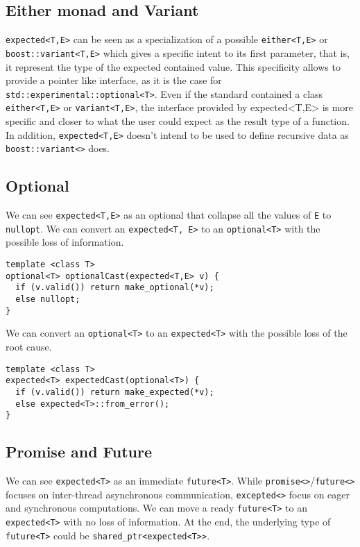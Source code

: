 \documentclass[a4paper,10pt]{article}
\newcommand{\cpp}[1]{\lstinline{#1}}
\begin{document}
\subsection{Either monad and Variant}

\cpp{expected<T,E>} can be seen as a specialization of a possible \cpp{either<T,E>} or \cpp{boost::variant<T,E>} which gives a specific intent to its first parameter, that is, it represent the type of the expected contained value. This specificity allows to provide a pointer like interface, as it is the case for \cpp{std::experimental::optional<T>}. Even if the standard contained a class \cpp{either<T,E>} or \cpp{variant<T,E>}, the interface provided by expected<T,E> is more specific and closer to what the user could expect as the result type of a function. In addition, \cpp{expected<T,E>} doesn't intend to be used to define recursive data as \cpp{boost::variant<>} does.

\subsection{Optional}

We can see \cpp{expected<T,E>} as an optional that collapse all the values of \cpp{E} to \cpp{nullopt}. We can convert an \cpp{expected<T, E>} to an \cpp{optional<T>} with the possible loss of information.

\begin{lstlisting}
template <class T>
optional<T> optionalCast(expected<T,E> v) {
  if (v.valid()) return make_optional(*v);
  else nullopt;
}
\end{lstlisting}

We can convert an \cpp{optional<T>} to an \cpp{expected<T>} with the possible loss of the root cause.

\begin{lstlisting}
template <class T>
expected<T> expectedCast(optional<T>) {
  if (v.valid()) return make_expected(*v);
  else expected<T>::from_error();
}
\end{lstlisting}

\subsection{Promise and Future}

We can see \cpp{expected<T>} as an immediate \cpp{future<T>}.
While \cpp{promise<>}/\cpp{future<>} focuses on inter-thread asynchronous communication, \cpp{excepted<>} focus on eager and synchronous computations.
We can move a ready \cpp{future<T>} to an \cpp{expected<T>} with no loss of information. At the end, the underlying type of \cpp{future<T>} could be \cpp{shared_ptr<expected<T>>}.
\end{document}
